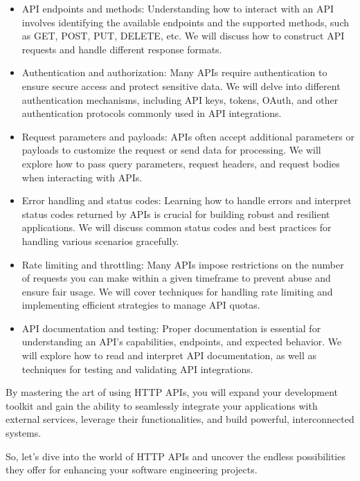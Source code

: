 \begin{itemize}
\item API endpoints and methods: Understanding how to interact with an API involves identifying the available endpoints and the supported methods, such as GET, POST, PUT, DELETE, etc. We will discuss how to construct API requests and handle different response formats.

\item Authentication and authorization: Many APIs require authentication to ensure secure access and protect sensitive data. We will delve into different authentication mechanisms, including API keys, tokens, OAuth, and other authentication protocols commonly used in API integrations.

\item Request parameters and payloads: APIs often accept additional parameters or payloads to customize the request or send data for processing. We will explore how to pass query parameters, request headers, and request bodies when interacting with APIs.

\item Error handling and status codes: Learning how to handle errors and interpret status codes returned by APIs is crucial for building robust and resilient applications. We will discuss common status codes and best practices for handling various scenarios gracefully.

\item Rate limiting and throttling: Many APIs impose restrictions on the number of requests you can make within a given timeframe to prevent abuse and ensure fair usage. We will cover techniques for handling rate limiting and implementing efficient strategies to manage API quotas.

\item API documentation and testing: Proper documentation is essential for understanding an API's capabilities, endpoints, and expected behavior. We will explore how to read and interpret API documentation, as well as techniques for testing and validating API integrations.
\end{itemize}

By mastering the art of using HTTP APIs, you will expand your development toolkit and gain the ability to seamlessly integrate your applications with external services, leverage their functionalities, and build powerful, interconnected systems.

So, let's dive into the world of HTTP APIs and uncover the endless possibilities they offer for enhancing your software engineering projects.